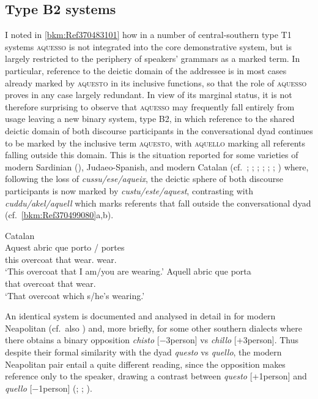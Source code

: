 \documentclass[output=paper]{langsci/langscibook}
\begin{document}
\subsection{Type B2 systems}\label{bkm:Ref370495450}

I noted in \cref{bkm:Ref370483101} how in a number of central-southern 
type T1 systems \textsc{aques\-so} is not integrated into the core demonstrative
system, but is largely restricted to the periphery of speakers’ grammars as a
marked term. In particular, reference to the deictic domain of the addressee is
in most cases already marked by \textsc{aquesto} in its inclusive functions, so
that the role of \textsc{aquesso} proves in any case largely redundant. In view
of its marginal status, it is not therefore surprising to observe that
\textsc{aquesso} may frequently fall entirely from usage leaving a new binary
system, type B2, in which reference to the shared deictic domain of both
discourse participants in the conversational dyad continues to be marked by the
inclusive term \textsc{aquesto}, with \textsc{aquello} marking all referents
falling outside this domain. This is the situation reported for some varieties
of modern Sardinian (\citealt[839]{Blasco-Ferrer:1988a}), Judaeo-Spanish, and
modern Catalan (cf.\ \citealt[281]{Badia-i-Margarit:1951a};
\citealt[501]{Badia-i-Margarit:1995a}; \citealt[81]{Duarte-i-Montserrat:1986a};
\citealt[120f]{Hualde:1992a}; \citealt[106]{Wheeler:1999a};
\citealt[§3.3]{Da-Milano:2007a};
\citealt[208f]{Nogue-Serrano:2015a}) where, following the loss of
\emph{cussu/ese/aqueix}, the deictic sphere of both discourse participants is
now marked by \emph{custu/este/aquest}, contrasting with
\emph{cuddu/akel/aquell} which marks referents that fall outside the
conversational dyad (cf.\ \ref{bkm:Ref370499080}a,b).

\ea\label{bkm:Ref370499080}Catalan \citep{Wheeler:1999a}\\
    \ea
        \gll Aquest  abric  que  porto  /  portes\\
        this  overcoat  that  wear.\Fsg{} {} wear.\Ssg{}\\
        \glt \enquote*{This overcoat that I am/you are wearing.}
    \ex
    \gll Aquell  abric  que  porta\\
         that  overcoat  that  wear.\Tsg{}\\
    \glt \enquote*{That overcoat which s/he’s wearing.}
    \z
\z

An identical system is documented and analysed in detail in
\citet[96--104]{ledgeway2004sviluppo} for modern Neapolitan (cf.\ also
\citealt[195--212]{Ledgeway:2009a}) and, more briefly, for some other southern
dialects where there obtains a binary opposition \emph{chisto}
[−3person] vs \emph{chillo} [+3person]. Thus despite their formal
similarity with the  dyad \emph{questo} vs \emph{quello}, the modern
Neapolitan pair entail a quite different reading, since the  opposition
makes reference only to the speaker, drawing a contrast between \emph{questo}
[+1person] and \emph{quello} [−1person]
(\citealt[125]{Maiden:1995a}; \citealt[324]{Vanelli:1995a};
\citealt[82f]{Maiden:2000a}).
\end{document}
